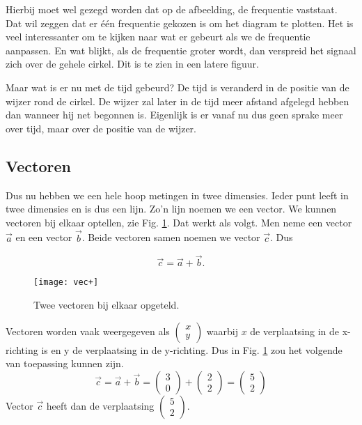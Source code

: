 \documentclass[11pt,fleqn]{book} %
\begin{document}
Hierbij moet wel gezegd worden dat op de afbeelding, de frequentie vaststaat. Dat wil zeggen dat er één frequentie gekozen is om het diagram te plotten. Het is veel interessanter om te kijken naar wat er gebeurt als we de frequentie aanpassen. En wat blijkt, als de frequentie groter wordt, dan verspreid het signaal zich over de gehele cirkel. Dit is te zien in een latere figuur.

Maar wat is er nu met de tijd gebeurd? De tijd is veranderd in de positie van de wijzer rond de cirkel. De wijzer zal later in de tijd meer afstand afgelegd hebben dan wanneer hij net begonnen is. Eigenlijk is er vanaf nu dus geen sprake meer over tijd, maar over de positie van de wijzer.

\subsection{Vectoren}
Dus nu hebben we een hele hoop metingen in twee dimensies. Ieder punt leeft in twee dimensies en is dus een lijn. Zo'n lijn noemen we een vector. We kunnen vectoren bij elkaar optellen, zie Fig. \ref{fig:vec+}. Dat werkt als volgt. Men neme een vector $\vec{a}$ en een vector $\vec{b}$. Beide vectoren samen noemen we vector $\vec{c}$. Dus

\begin{displaymath}
	\vec{c}=\vec{a}+\vec{b}.
\end{displaymath}

\begin{figure}[h]
	\centering\texttt{[image: vec+]}
	\caption{Twee vectoren bij elkaar opgeteld.}
	\label{fig:vec+}
\end{figure}

Vectoren worden vaak weergegeven als $\begin{pmatrix}x \\ y\end{pmatrix}$ waarbij $x$ de verplaatsing in de x-richting is en y de verplaatsing in de y-richting. Dus in Fig. \ref{fig:vec+} zou het volgende van toepassing kunnen zijn.
\begin{displaymath}
	\vec{c}=\vec{a}+\vec{b}=\begin{pmatrix}3 \\ 0\end{pmatrix}+\begin{pmatrix}2 \\ 2\end{pmatrix}=\begin{pmatrix}5 \\ 2\end{pmatrix}
\end{displaymath}
Vector $\vec{c}$ heeft dan de verplaatsing $\begin{pmatrix}5 \\ 2\end{pmatrix}$.
\end{document}
